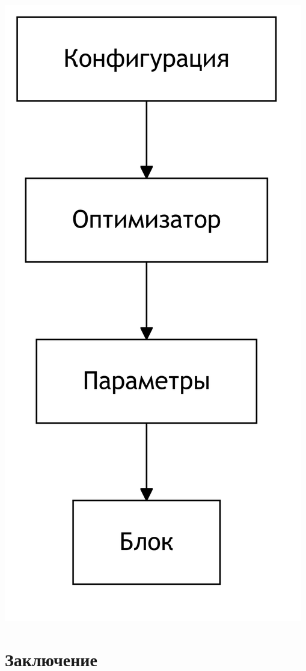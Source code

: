 \documentclass[14pt,a4paper,oneside,openany]{extbook}
\begin{document}
\begin{center}
\includegraphics[width=.9\linewidth]{img/mermaid/optimization_schema.png}
\label{}
\end{center}
\chapter*{Заключение}
\label{sec:org43361a5}
\printbibliography[title=СПИСОК\spaceИСПОЛЬЗОВАНЫХ\spaceИСТОЧНИКОВ]
\end{document}
